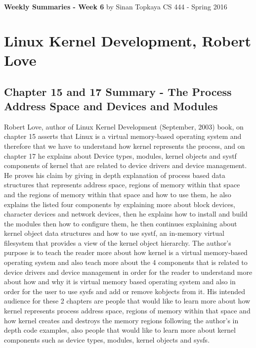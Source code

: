 \documentclass[letterpaper,10pt,draftclsnofoot,onecolumn]{IEEEtran}
\begin{document}
\begin{titlepage}
	
	\begin{center}
	\bigbreak
	\textbf{Weekly Summaries - Week 6}
	\bigbreak
	by Sinan Topkaya
	\smallbreak
	CS 444 - Spring 2016
	\end{center}
\end{titlepage}
	
\section*{Linux Kernel Development, Robert Love}
\subsection*{Chapter 15 and 17 Summary - The Process Address Space and Devices and Modules}

Robert Love, author of Linux Kernel Development (September, 2003) book, on chapter 15 asserts that Linux is a virtual memory-based operating system and therefore that we have to understand how kernel represents the process, and on chapter 17 he explains about Device types, modules, kernel objects and systf components of kernel that are related to device drivers and device management. He proves his claim by giving in depth explanation of process based data structures that represents address space, regions of memory within that space and the regions of memory within that space and how to use them, he also explains the listed four components by explaining more about block devices, character devices and network devices, then he explains how to install and build the modules then how to configure them, he then continues explaining about kernel object data structures and how to use systf, an in-memory virtual filesystem that provides a view of the kernel object hierarchy. The author’s purpose is to teach the reader more about how kernel is a virtual memory-based operating system and also teach more about the 4 components that is related to device drivers and device management in order for the reader to understand more about how and why it is virtual memory based operating system and also in order for the user to use sysfs and add or remove kobjects from it. His intended audience for these 2 chapters are people that would like to learn more about how kernel represents process address space, regions of memory within that space and how kernel creates and destroys the memory regions following the author’s in depth code examples, also people that would like to learn more about kernel components such as device types, modules, kernel objects and sysfs.
\end{document}
